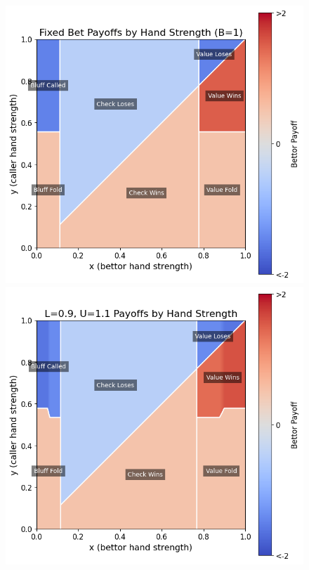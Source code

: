 \documentclass[../../main/main.tex]{subfiles}
\begin{document}
\clearpage
{}
\begin{figure}[p]
    \begin{adjustwidth}{-1.25in}{-1.25in}
        \centering
        \begin{minipage}{0.4\textwidth}
            \centering
            \includegraphics[width=\textwidth]{../payoff_analysis/images/payoffs_1_1.png}
        \end{minipage}
        \hspace{0.05\textwidth}
        \begin{minipage}{0.4\textwidth}
            \centering
            \includegraphics[width=\textwidth]{../payoff_analysis/images/payoffs_0.9_1.1.png}

\end{minipage}
\end{adjustwidth}
\end{figure}
\end{document}
